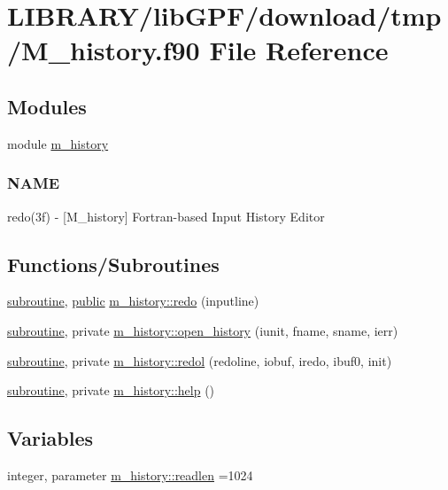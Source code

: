 \hypertarget{M__history_8f90}{}\section{L\+I\+B\+R\+A\+R\+Y/lib\+G\+P\+F/download/tmp/\+M\+\_\+history.f90 File Reference}
\label{M__history_8f90}
\subsection*{Modules}
\begin{DoxyCompactItemize}
\item 
module \hyperlink{namespacem__history}{m\+\_\+history}
\begin{DoxyCompactList}\small\item\em \subsubsection*{N\+A\+ME}

redo(3f) -\/ \mbox{[}M\+\_\+history\mbox{]} Fortran-\/based Input History Editor \end{DoxyCompactList}\end{DoxyCompactItemize}
\subsection*{Functions/\+Subroutines}
\begin{DoxyCompactItemize}
\item 
\hyperlink{M__stopwatch_83_8txt_acfbcff50169d691ff02d4a123ed70482}{subroutine}, \hyperlink{M__stopwatch_83_8txt_a2f74811300c361e53b430611a7d1769f}{public} \hyperlink{namespacem__history_a1abbc2c426b89526939d4389c9d3e391}{m\+\_\+history\+::redo} (inputline)
\item 
\hyperlink{M__stopwatch_83_8txt_acfbcff50169d691ff02d4a123ed70482}{subroutine}, private \hyperlink{namespacem__history_ac181d59688bc06d4ba7465841721e766}{m\+\_\+history\+::open\+\_\+history} (iunit, fname, sname, ierr)
\item 
\hyperlink{M__stopwatch_83_8txt_acfbcff50169d691ff02d4a123ed70482}{subroutine}, private \hyperlink{namespacem__history_a155404b1f975ae6fe778f836c043eeb2}{m\+\_\+history\+::redol} (redoline, iobuf, iredo, ibuf0, init)
\item 
\hyperlink{M__stopwatch_83_8txt_acfbcff50169d691ff02d4a123ed70482}{subroutine}, private \hyperlink{namespacem__history_a8d0830530f10435242fa57853baad282}{m\+\_\+history\+::help} ()
\end{DoxyCompactItemize}
\subsection*{Variables}
\begin{DoxyCompactItemize}
\item 
integer, parameter \hyperlink{namespacem__history_aca543c267d8b80d0690c33e4a684143b}{m\+\_\+history\+::readlen} =1024
\end{DoxyCompactItemize}
